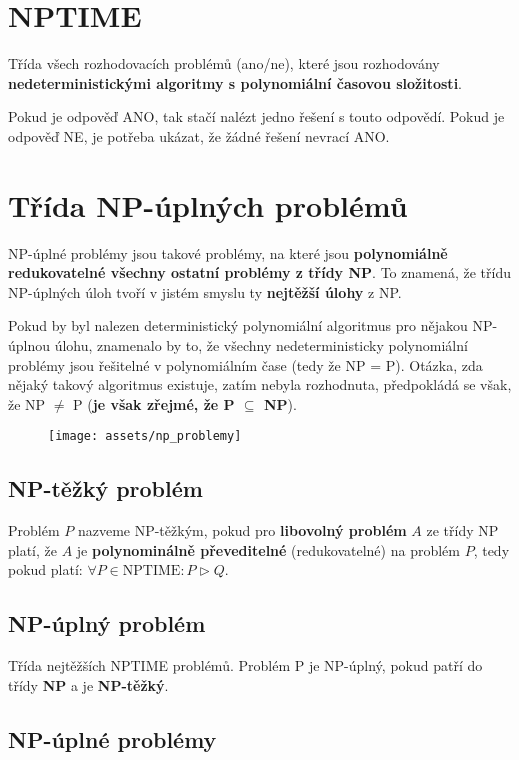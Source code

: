 \section{NPTIME}
Třída všech rozhodovacích problémů (ano/ne), které jsou rozhodovány \textbf{nedeterministickými algoritmy s polynomiální časovou složitosti}.

Pokud je odpověď ANO, tak stačí nalézt jedno řešení s touto odpovědí. Pokud je odpověď NE, je potřeba ukázat, že žádné řešení nevrací ANO.

\section{Třída NP-úplných problémů}
NP-úplné problémy jsou takové problémy, na které jsou \textbf{polynomiálně redukovatelné všechny ostatní problémy z třídy NP}. To znamená, že třídu NP-úplných úloh tvoří v jistém smyslu ty \textbf{nejtěžší úlohy} z NP.

Pokud by byl nalezen deterministický polynomiální algoritmus pro nějakou NP-úplnou úlohu, znamenalo by to, že všechny nedeterministicky polynomiální problémy jsou řešitelné v polynomiálním čase (tedy že NP = P). Otázka, zda nějaký takový algoritmus existuje, zatím nebyla rozhodnuta, předpokládá se však, že NP $\neq$ P (\textbf{je však zřejmé, že P $\subseteq$ NP}).

\begin{figure}[H]
    \centering
    \texttt{[image: assets/np\_problemy]}
\end{figure}

\subsection{NP-těžký problém}
Problém $P$ nazveme NP-těžkým, pokud pro \textbf{libovolný problém} $A$ ze třídy NP platí, že $A$ je \textbf{polynominálně převeditelné} (redukovatelné) na problém $P$, tedy pokud platí:
$\forall P \in \textrm{NPTIME}: P \triangleright Q$.

\subsection{NP-úplný problém}
Třída nejtěžších NPTIME problémů. Problém P je NP-úplný, pokud patří do třídy \textbf{NP} a je \textbf{NP-těžký}.

\subsection{NP-úplné problémy}


